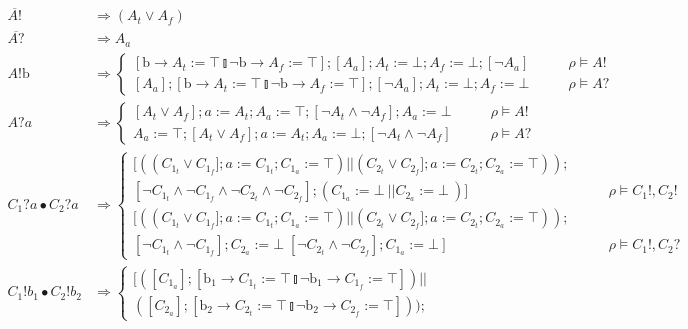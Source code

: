 \documentclass[times, 10pt]{article}
\begin{document}
\begin{align*}
    \overline{A!} & \Rightarrow (A_t \vee A_f) \\
    \overline{A?} & \Rightarrow A_a \\
    A!\mathrm{b} & \Rightarrow \left\{ \begin{matrix} [\mathrm{b} \rightarrow A_t := \top \talloblong \neg \mathrm{b} \rightarrow A_f := \top]; [A_a]; A_t := \bot; A_f := \bot; [\neg A_a] & \qquad \rho \vDash A! \\
                                                      [A_a]; [\mathrm{b} \rightarrow A_t := \top \talloblong \neg \mathrm{b} \rightarrow A_f := \top]; [\neg A_a]; A_t := \bot; A_f := \bot & \qquad \rho \vDash A? \end{matrix} \right. \\
    A?a & \Rightarrow \left\{ \begin{matrix} [A_t \vee A_f]; a := A_t; A_a := \top; [\neg A_t \wedge \neg A_f]; A_a := \bot & \qquad \rho \vDash A! \\
                                             A_a := \top; [A_t \vee A_f]; a := A_t; A_a := \bot; [\neg A_t \wedge \neg A_f] & \qquad \rho \vDash A? \end{matrix} \right. \\
    C_1?a \bullet C_2?a & \Rightarrow \left\{ \begin{matrix} [ ((C_{1_t} \vee C_{1_f}]; a := C_{1_t}; C_{1_a} := \top) || (C_{2_t} \vee C_{2_f}]; a := C_{2_t}; C_{2_a} := \top)); 
    \\ [\neg C_{1_t} \wedge \neg C_{1_f} \wedge \neg C_{2_t} \wedge \neg C_{2_f}]; (C_{1_a} := \bot\ ||C_{2_a} := \bot\ ) ]& \qquad \rho \vDash C_1!, C_2! \\
     [ ((C_{1_t} \vee C_{1_f}]; a := C_{1_t}; C_{1_a} := \top) || (C_{2_t} \vee C_{2_f}]; a := C_{2_t}; C_{2_a} := \top)); 
    \\ [\neg C_{1_t} \wedge \neg C_{1_f}];  C_{2_a} := \bot\; [ \neg C_{2_t} \wedge \neg C_{2_f}]; C_{1_a} := \bot\ ]& \qquad \rho \vDash C_1!, C_2?
      \end{matrix} \right.  \\
          C_1!b_1 \bullet C_2!b_2 & \Rightarrow \left\{ \begin{matrix} [ ([C_{1_a}]; [\mathrm{b_1} \rightarrow C_{1_t} := \top \talloblong \neg \mathrm{b_1} \rightarrow C_{1_f} := \top]) || \\ ([C_{2_a}]; [\mathrm{b_2} \rightarrow C_{2_t} := \top \talloblong \neg \mathrm{b_2} \rightarrow C_{2_f} := \top])); 

\end{matrix}
\end{align*}
\end{document}

